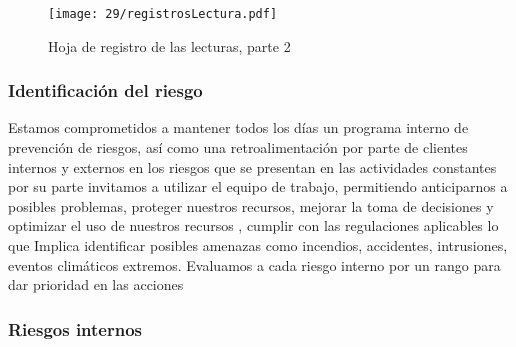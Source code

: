     \begin{figure}[H]
        \centering
        \texttt{[image: 29/registrosLectura.pdf]}
        \caption{Hoja de registro de las lecturas, parte 2  }
        \label{fig:registrosLectura.pdf}
    \end{figure}
    
    \subsubsection{Identificación del riesgo}
    
    Estamos comprometidos a mantener todos los días un programa interno de prevención de riesgos, así como una retroalimentación por parte de clientes internos y externos en los riesgos que se presentan en las actividades constantes por su parte invitamos a utilizar el equipo de trabajo, permitiendo anticiparnos a posibles problemas, proteger nuestros recursos, mejorar la toma de decisiones y  optimizar el uso de nuestros recursos , cumplir con las regulaciones aplicables lo que Implica identificar posibles amenazas como incendios, accidentes, intrusiones,  eventos climáticos extremos.
    Evaluamos a cada riesgo interno por un rango para dar prioridad en las acciones 
    
    
    \subsubsection{Riesgos internos}
    

